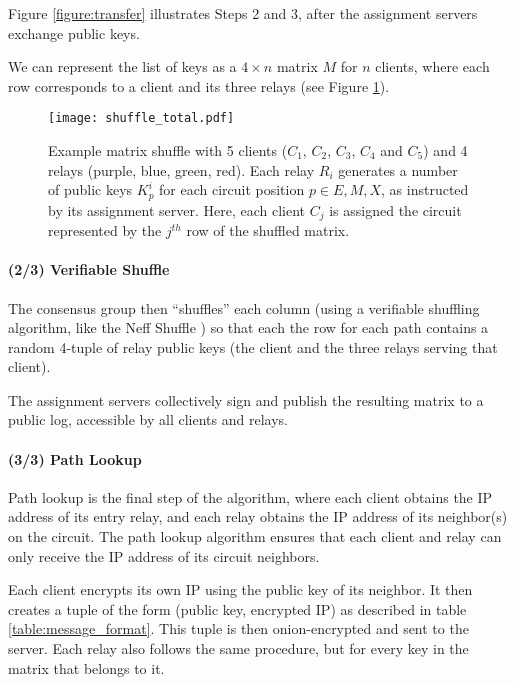 Figure \ref{figure:transfer} illustrates Steps 2 and 3, after the assignment
servers exchange public keys.

We can represent the list of keys as a $4 \times n$ matrix $M$ for $n$
clients, where each row corresponds to a client and its three relays (see
Figure \ref{figure:shuffle}).

\begin{figure}
  \centering
    \texttt{[image: shuffle\_total.pdf]}
  \caption{
    Example matrix shuffle with 5 clients ($C_1$, $C_2$, $C_3$, $C_4$ and $C_5$) 
    and 4 relays (purple, blue, green, red). Each relay $R_i$ generates a number 
    of public keys $K_p^i$ for each circuit position $p \in {E, M, X}$, as 
    instructed by its assignment server. Here, each client $C_j$ is assigned the 
    circuit represented by the $j^{th}$ row of the shuffled matrix. 
  }
  \label{figure:shuffle}
\end{figure}


\paragraph{(2/3) Verifiable Shuffle} The consensus group then ``shuffles''
each column (using a verifiable shuffling algorithm, like the Neff Shuffle
\cite{neff2001verifiable}) so that each the row for each path
contains a random 4-tuple of relay public keys
(the client and the three relays serving that client).

The assignment servers collectively sign and publish the resulting matrix to a
public log, accessible by all clients and relays.

\paragraph{(3/3) Path Lookup}
Path lookup is the final step of the algorithm, where each client obtains the
IP address of its entry relay, and each relay obtains the IP address of its
neighbor(s) on the circuit. The path lookup algorithm ensures that each client
and relay can only receive the IP address of its circuit neighbors.

Each client encrypts its own IP using the public key of its neighbor. It then
creates a tuple of the form (public key, encrypted IP) as described in table
\ref{table:message_format}. This tuple is then onion-encrypted and sent to the
server.  Each relay also follows the same procedure, but for every key in the
matrix that belongs to it.


